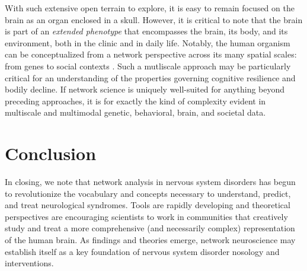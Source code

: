 \documentclass[12pt]{article}
\begin{document}
With such extensive open terrain to explore, it is easy to remain focused on the brain as an organ enclosed in a skull. However, it is critical to note that the brain is part of an \emph{extended phenotype} \cite{dawkins1999extended} that encompasses the brain, its body, and its environment, both in the clinic and in daily life. Notably, the human organism can be conceptualized from a network perspective across its many spatial scales: from genes to social contexts \cite{dhand2016social}. Such a mutliscale approach may be particularly critical for an understanding of the properties governing cognitive resilience and bodily decline. If network science is uniquely well-suited for anything beyond preceding approaches, it is for exactly the kind of complexity evident in multiscale and multimodal genetic, behavioral, brain, and societal data. 

\section*{Conclusion}

In closing, we note that network analysis in nervous system disorders has begun to revolutionize the vocabulary and concepts necessary to understand, predict, and treat neurological syndromes. Tools are rapidly developing and theoretical perspectives are encouraging scientists to work in communities that creatively study and treat a more comprehensive (and necessarily complex) representation of the human brain. As findings and theories emerge, network neuroscience may establish itself as a key foundation of nervous system disorder nosology and interventions.

\clearpage
\newpage

\end{document}
